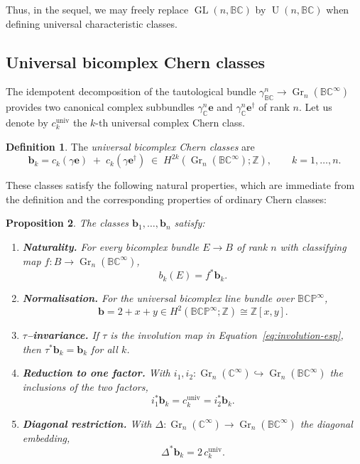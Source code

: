 \documentclass[11pt]{amsart}
\newcommand{\BC}{\mathbb{BC}}       %
\newcommand{\C}{\mathbb{C}}          %
\newcommand{\Z}{\mathbb{Z}}
\newcommand{\e}{\mathbf{e}}          %
\newcommand{\ed}{\mathbf{e}^\dagger} %
\newcommand{\GL}{\operatorname{GL}}  %
\newcommand{\U}{\operatorname{U}}    %
\newcommand{\Gr}{\operatorname{Gr}}
\newtheorem{prop}{Proposition}[section]   %
\theoremstyle{definition}
\newtheorem{defn}[prop]{Definition}       %
\begin{document}
Thus, in the sequel, we may freely replace $\GL(n,\BC)$ by $\U(n,\BC)$ when defining universal characteristic classes.

\subsection{Universal bicomplex Chern classes}

The idempotent decomposition of the tautological bundle $\gamma_\BC^n\to \Gr_n(\BC^\infty)$ provides two canonical complex subbundles $\gamma_\C^n\e$ and $\gamma_\C^n\ed$ of rank $n$. Let us denote by $c_k^{\mathrm{univ}}$ the $k$-th universal complex Chern class.

\begin{defn}\label{def:universal-b}
The \emph{universal bicomplex Chern classes} are
\begin{equation*}
\mathbf{b}_k= c_k(\gamma\e) \;+\; c_k(\gamma\ed)
\;\in\; H^{2k}(\Gr_n(\BC^\infty);\Z),\qquad k=1,\dots,n.
\end{equation*}
\end{defn}

These classes satisfy the following natural properties, which are immediate from the definition and the corresponding properties of ordinary Chern classes:

\begin{prop}\label{prop:universal-axioms}
The classes $\mathbf{b}_1,\dots,\mathbf{b}_n$ satisfy:
\begin{enumerate}
\item\label{it:nat} \textbf{Naturality.} For every bicomplex bundle $E\to B$ of rank $n$ with classifying map $f:B\to \Gr_n(\BC^\infty)$,
\begin{equation*}
b_k(E)=f^*\mathbf{b}_k.
\end{equation*}
\item\label{it:nor} \textbf{Normalisation.} For the universal bicomplex line bundle over $\mathbb{BCP}^\infty$,
\begin{equation*}
\mathbf{b}=2+x+y\in H^2(\mathbb{BCP}^\infty;\Z)\cong\Z[x,y].
\end{equation*}
\item \label{it:inv}\textbf{$\tau$--invariance.} If $\tau$ is the involution map in Equation~\ref{eq:involution-esp}, then $\tau^*\mathbf{b}_k=\mathbf{b}_k$ for all $k$.
\item\label{it:red} \textbf{Reduction to one factor.} With $i_1,i_2:\Gr_n(\C^\infty)\hookrightarrow \Gr_n(\BC^\infty)$ the inclusions of the two factors,
\begin{equation*}
i_1^*\mathbf{b}_k=c_k^{\mathrm{univ}}=i_2^*\mathbf{b}_k.
\end{equation*}
\item\label{it:diag} \textbf{Diagonal restriction.} With $\Delta:\operatorname{Gr}_n(\C^\infty)\to \Gr_n(\BC^\infty)$ the diagonal embedding,
\begin{equation*}
\Delta^*\mathbf{b}_k=2\,c_k^{\mathrm{univ}}.
\end{equation*}
\end{enumerate}
\end{prop}
\end{document}
